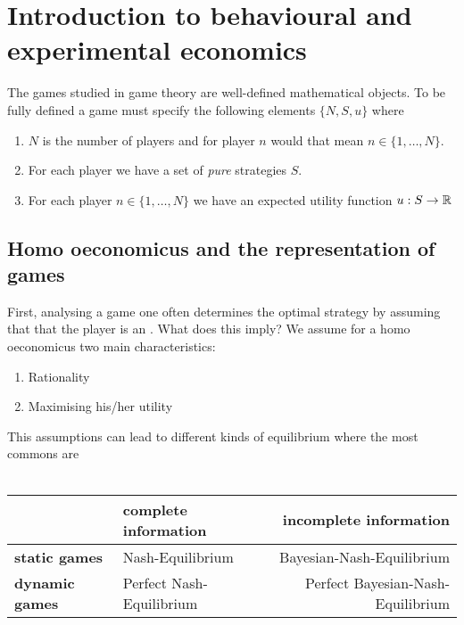 

\chapter{Introduction to behavioural and experimental economics} 

The games studied in game theory are well-defined mathematical objects. To be fully defined a game must specify the following elements $\{ N, S, u \}$ where

	\begin{enumerate}
		\item $N$ is the number of players and for player $n$ would that mean $n \in \{ 1, \dotsc, N \}$.
		\item For each player we have a set of \textit{pure} strategies $S$.
		\item For each player $n \in \{1, \dotsc, N \}$ we have an expected utility function $u : S \rightarrow \mathbb{R}$
	\end{enumerate}


\section{Homo oeconomicus and the representation of games}
First, analysing a game one often determines the optimal strategy by assuming that that the player is an . What does this imply? We assume for a homo oeconomicus two main characteristics:
\begin{enumerate}
	\item Rationality
	\item Maximising his/her utility
\end{enumerate}


This assumptions can lead to different kinds of equilibrium where the most commons are \\ \\
\begin{tabular}{|l|l|r|}
	\hline\hline
  			& {\textbf{complete information}} & {\textbf{incomplete information}} \\
                                                    \hline
   \textbf{static games} & Nash-Equilibrium & Bayesian-Nash-Equilibrium\arrayrulewidth2pt \\
                                               \cline{1-3}
   \textbf{dynamic games} & Perfect Nash-Equilibrium & Perfect Bayesian-Nash-Equilibrium \\ \hline\hline
\end{tabular}

